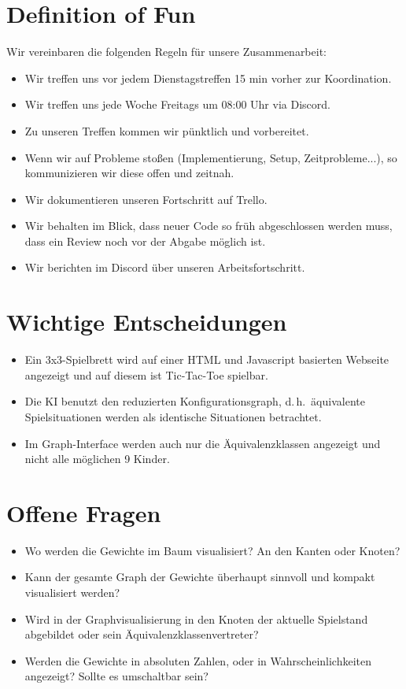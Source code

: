 \documentclass[titlepage]{scrartcl}
\begin{document}
\section{Definition of Fun}%
Wir vereinbaren die folgenden Regeln für unsere Zusammenarbeit:
\begin{itemize}
	\item Wir treffen uns vor jedem Dienstagstreffen 15 min vorher zur Koordination.
	\item Wir treffen uns jede Woche Freitags um 08:00 Uhr via Discord.
	\item Zu unseren Treffen kommen wir pünktlich und vorbereitet.
	\item Wenn wir auf Probleme stoßen (Implementierung, Setup, Zeitprobleme...), so kommunizieren wir diese offen und zeitnah.
	\item Wir dokumentieren unseren Fortschritt auf Trello.
	\item Wir behalten im Blick, dass neuer Code so früh abgeschlossen werden muss, dass ein Review noch vor der Abgabe möglich ist.
	\item Wir berichten im Discord über unseren Arbeitsfortschritt.
\end{itemize}

\section{Wichtige Entscheidungen}
\begin{itemize}
	\item Ein 3x3-Spielbrett wird auf einer HTML und Javascript basierten Webseite angezeigt und auf diesem ist Tic-Tac-Toe spielbar.
	\item Die KI benutzt den reduzierten Konfigurationsgraph, d.\,h.\ äquivalente Spielsituationen werden als identische Situationen betrachtet.
	\item Im Graph-Interface werden auch nur die Äquivalenzklassen angezeigt und nicht alle möglichen 9 Kinder.
\end{itemize}

\section{Offene Fragen}
\begin{itemize}
	\item Wo werden die Gewichte im Baum visualisiert? An den Kanten oder Knoten?
	\item Kann der gesamte Graph der Gewichte überhaupt sinnvoll und kompakt visualisiert werden?
	\item Wird in der Graphvisualisierung in den Knoten der aktuelle Spielstand abgebildet oder sein Äquivalenzklassenvertreter?
	\item Werden die Gewichte in absoluten Zahlen, oder in Wahrscheinlichkeiten angezeigt? Sollte es umschaltbar sein?
\end{itemize}
\end{document}
